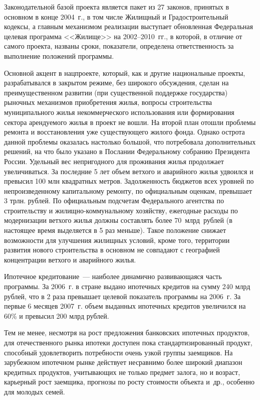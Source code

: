 \documentclass[article, 12pt, russian, oneside]{ncc}
\begin{document}
Законодательной базой проекта является пакет из 27 законов, принятых в
основном в конце 2004~г., в том числе Жилищный и Градостроительный
кодексы, а главным механизмом реализации выступает обновленная
Федеральная целевая программа <<Жилище>> на 2002--2010~гг., в которой,
в отличие от самого проекта, названы сроки, показатели, определена
ответственность за выполнение положений программы.

Основной акцент в нацпроекте, который, как и другие национальные
проекты, разрабатывался в закрытом режиме, без широкого обсуждения,
сделан на преимущественном развитии (при существенной поддержке
государства) рыночных механизмов приобретения жилья, вопросы
строительства муниципального жилья некоммерческого использования или
формирования сектора арендуемого жилья в проект не вошли. На второй
план отошли проблемы ремонта и восстановления уже существующего жилого
фонда. Однако острота данной проблемы оказалась настолько большой, что
потребовала дополнительных решений, на что было указано в Послании
Федеральному собранию Президента России. Удельный вес непригодного для
проживания жилья продолжает увеличиваться. За последние 5 лет объем
ветхого и аварийного жилья удвоился и превысил 100 млн квадратных
метров. Задолженность бюджетов всех уровней по непроизведенному
капитальному ремонту, по официальным оценкам, превышает 3 трлн.
рублей. По официальным подсчетам Федерального агентства по
строительству и жилищно-коммунальному хозяйству, ежегодные расходы по
модернизации ветхого жилья должны составлять более 70~млрд~рублей (в
настоящее время выделяется в 5 раз меньше). Такое положение снижает
возможности для улучшения жилищных условий, кроме того, территории
развития нового строительства в основном не совпадают с географией
концентрации ветхого и аварийного жилья.
            
Ипотечное кредитование~--- наиболее динамично развивающаяся часть
программы. За 2006~г. в стране выдано ипотечных кредитов на сумму 240
млрд рублей, что в 2 раза превышает целевой показатель программы на
2006~г.  За первые 6 месяцев 2007~г. объем выданных ипотечных кредитов
увеличился на 60\% и превысил 200 млрд рублей.

Тем не менее, несмотря на рост предложения банковских ипотечных
продуктов, для отечественного рынка ипотеки доступен пока
стандартизированный продукт, способный удовлетворить потребности очень
узкой группы заемщиков. На зарубежном ипотечном рынке действует
несравнимо более широкий диапазон кредитных продуктов, учитывающих не
только предмет залога, но и возраст, карьерный рост заемщика, прогнозы
по росту стоимости объекта и~др., особенно для молодых семей.
                                                                                           
\end{document}
